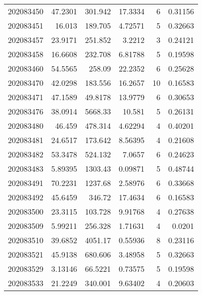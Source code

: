 \begin{tabular}{rrrrrr}
 202083450 &         47.2301  &      301.942  &           17.3334  &           6 & 0.31156 \\
 202083451 &         16.013   &      189.705  &            4.72571 &           5 & 0.32663 \\
 202083457 &         23.9171  &      251.852  &            3.2212  &           3 & 0.24121 \\
 202083458 &         16.6608  &      232.708  &            6.81788 &           5 & 0.19598 \\
 202083460 &         54.5565  &      258.09   &           22.2352  &           6 & 0.25628 \\
 202083470 &         42.0298  &      183.556  &           16.2657  &          10 & 0.16583 \\
 202083471 &         47.1589  &       49.8178 &           13.9779  &           6 & 0.30653 \\
 202083476 &         38.0914  &     5668.33   &           10.581   &           5 & 0.26131 \\
 202083480 &         46.459   &      478.314  &            4.62294 &           4 & 0.40201 \\
 202083481 &         24.6517  &      173.642  &            8.56395 &           4 & 0.21608 \\
 202083482 &         53.3478  &      524.132  &            7.0657  &           6 & 0.24623 \\
 202083483 &          5.89395 &     1303.43   &            0.09871 &           5 & 0.48744 \\
 202083491 &         70.2231  &     1237.68   &            2.58976 &           6 & 0.33668 \\
 202083492 &         45.6459  &      346.72   &           17.4634  &           6 & 0.16583 \\
 202083500 &         23.3115  &      103.728  &            9.91768 &           4 & 0.27638 \\
 202083509 &          5.99211 &      256.328  &            1.71631 &           4 & 0.0201  \\
 202083510 &         39.6852  &     4051.17   &            0.55936 &           8 & 0.23116 \\
 202083521 &         45.9138  &      680.606  &            3.48958 &           5 & 0.32663 \\
 202083529 &          3.13146 &       66.5221 &            0.73575 &           5 & 0.19598 \\
 202083533 &         21.2249  &      340.001  &            9.63402 &           4 & 0.20603 \\

\end{tabular}
